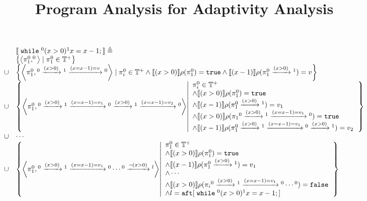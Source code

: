 \documentclass[a4paper,11pt]{article}
\begin{document}
\title{Program Analysis for Adaptivity Analysis}

\author{}

\date{}

\maketitle
%
\begin{example}
\[
\begin{array}{ll}
& \sem{
\ewhile {}^0 (x > 0) {}^1 x = x - 1;
} \triangleq \\
& \left\{ \left< \pi_1^0, ^0\right> \mid \pi_1^0 \in \mathbb{T^{+}} \right\}
\\
\cup & \left\{ \left< \pi_1^0, {}^0 \xrightarrow{(x > 0)} {}^1 \xrightarrow{(x = x - 1) = v} {}^0 \right> 
\mid \pi_i^0 \in \mathbb{T^{+}} \land 
\sem{(x > 0)}\env(\pi_1^0) = \etrue  \land
\sem{(x - 1)}\env(\pi_1^0 \xrightarrow{(x > 0)} {}^1) = v \right\}
\\
\cup & \left\{ \left< \pi_1^0, {}^0 \xrightarrow{(x > 0)} {}^1 \xrightarrow{(x = x - 1) = v_1} {}^0 \xrightarrow{(x > 0)} {}^1 \xrightarrow{(x = x - 1) = v_2} {}^0 \right> 
\left \vert 
\begin{array}{l}
\pi_i^0 \in \mathbb{T^{+}} \\
\land 
\sem{(x > 0)}\env(\pi_1^0) = \etrue  \\
\land
\sem{(x - 1)}\env(\pi_1^0 \xrightarrow{(x > 0)} {}^1) = v_1 \\
\land 
\sem{(x > 0)}\env(\pi_1{}^0 \xrightarrow{(x > 0)} {}^1 \xrightarrow{(x = x - 1) = v_1} {}^0) = \etrue \\
\land
\sem{(x - 1)}\env(\pi_1^0 \xrightarrow{(x > 0)} {}^1 \xrightarrow{(x = x - 1) = v_1} {}^0 \xrightarrow{(x > 0)} {}^1) = v_2
\end{array}
\right.
\right\}
\\
\cup & \cdots 
\\
\cup & \left\{ \left< \pi_1^0, {}^0 \xrightarrow{(x > 0)} {}^1\xrightarrow{(x = x - 1) = v_1} {}^0 \cdots  {}^0 \xrightarrow{\neg(x > 0)} {}^l \right>  
\left \vert 
\begin{array}{l}
\pi_1^0 \in \mathbb{T^{+}}\\
\land 
\sem{(x > 0)}\env(\pi_1^0) = \etrue  \\
\land
\sem{(x - 1)}\env(\pi_1^0 \xrightarrow{(x > 0)} {}^1) = v_1 \\
\land \cdots \\
\land 
\sem{(x > 0)}\env(\pi_i{}^0 \xrightarrow{(x > 0)} {}^1\xrightarrow{(x = x - 1) = v_1} {}^0 \cdots  {}^0) = \efalse \\
\land l = \kw{aft}[\ewhile {}^0 (x > 0) {}^1 x = x - 1;]
\end{array}
\right.
\right\}
\end{array}
\]
\end{example}
\end{document}
